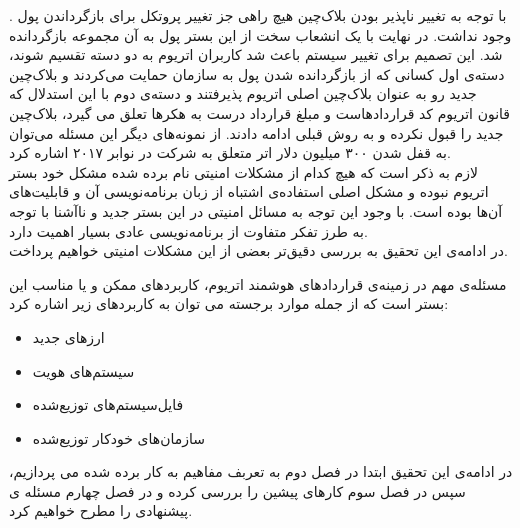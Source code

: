 . با توجه به تغییر ناپذیر بودن بلاک‌چین هیچ راهی جز تغییر پروتکل برای بازگرداندن پول وجود نداشت. در نهایت با یک انشعاب سخت
 از این بستر پول به آن مجموعه بازگردانده شد. این تصمیم برای تغییر سیستم باعث شد کاربران اتریوم به دو دسته تقسیم شوند، دسته‌ی اول کسانی که از بازگردانده شدن پول به سازمان حمایت می‌کردند و بلاک‌چین جدید رو به عنوان بلاک‌چین اصلی اتریوم پذیرفتند و دسته‌ی دوم با این استدلال که قانون اتریوم کد قراردادهاست و مبلغ قرارداد درست به هکرها تعلق می گیرد،  بلاک‌چین جدید را قبول نکرده و به روش قبلی ادامه دادند. از نمونه‌های دیگر این مسئله می‌توان به قفل شدن ۳۰۰ میلیون دلار
 اتر متعلق به شرکت
 در نوابر ۲۰۱۷ اشاره کرد. 
 \\
 لازم به ذکر است که هیچ کدام از مشکلات امنیتی نام برده شده مشکل خود بستر اتریوم نبوده و مشکل اصلی استفاده‌ی اشتباه از زبان برنامه‌نویسی آن و قابلیت‌های آن‌ها بوده است. با وجود این توجه به مسائل امنیتی در این بستر جدید و ناآشنا با توجه به طرز تفکر متفاوت از برنامه‌نویسی عادی بسیار اهمیت دارد. 
 \\
 در ادامه‌ی این تحقیق به بررسی دقیق‌تر بعضی از این مشکلات امنیتی خواهیم پرداخت. 
 \par
 
مسئله‌ی مهم در زمینه‌ی قراردادهای هوشمند اتریوم، کاربردهای ممکن و یا مناسب این بستر است که از جمله موارد برجسته می توان به کاربردهای زیر اشاره کرد: 
 \begin{itemize}
 	\item 
 	ارز‌های جدید
 	\item
 	سیستم‌های هویت
 	\item
 	فایل‌سیستم‌های توزیع‌شده
 	\item
 	سازمان‌های خودکار توزیع‌شده
 \end{itemize}
\par
در ادامه‌ی این تحقیق ابتدا در فصل دوم به تعربف مفاهیم به کار برده شده می پردازیم، سپس در فصل سوم کارهای پیشین را بررسی کرده و در فصل چهارم مسئله ی پیشنهادی را مطرح خواهیم کرد.

